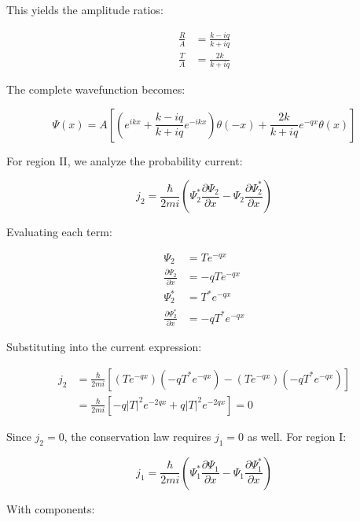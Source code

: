 \documentclass[italian]{HKNdocument}
\begin{document}
This yields the amplitude ratios:

\begin{align}
\frac{R}{A} & =\frac{k-i q}{k+i q} \\
\frac{T}{A} & =\frac{2 k}{k+i q} \label{eq:6.41}
\end{align}

The complete wavefunction becomes:

\begin{equation}
\Psi(x)=A\left[\left(e^{i k x}+\frac{k-i q}{k+i q} e^{-i k x}\right) \theta(-x)+\frac{2 k}{k+i q} e^{-q x} \theta(x)\right] \label{eq:6.42}
\end{equation}

For region II, we analyze the probability current:

\begin{equation}
j_{2}=\frac{\hbar}{2 m i}\left(\Psi_{2}^{*} \frac{\partial \Psi_{2}}{\partial x}-\Psi_{2} \frac{\partial \Psi_{2}^{*}}{\partial x}\right) \label{eq:6.43}
\end{equation}

Evaluating each term:

\begin{align}
\Psi_{2} & =T e^{-q x} \\
\frac{\partial \Psi_{2}}{\partial x} & =-q T e^{-q x} \\
\Psi_{2}^{*} & =T^{*} e^{-q x}  \label{eq:6.44}\\
\frac{\partial \Psi_{2}^{*}}{\partial x} & =-q T^{*} e^{-q x}
\end{align}

Substituting into the current expression:

\begin{align}
j_{2} & =\frac{\hbar}{2 m i}\left[\left(T e^{-q x}\right)\left(-q T^{*} e^{-q x}\right)-\left(T e^{-q x}\right)\left(-q T^{*} e^{-q x}\right)\right] \\
& =\frac{\hbar}{2 m i}\left[-q|T|^{2} e^{-2 q x}+q|T|^{2} e^{-2 q x}\right]=0 \label{eq:6.45}
\end{align}

Since $j_2 = 0$, the conservation law requires $j_1 = 0$ as well. For region I:

\begin{equation}
j_{1}=\frac{\hbar}{2 m i}\left(\Psi_{1}^{*} \frac{\partial \Psi_{1}}{\partial x}-\Psi_{1} \frac{\partial \Psi_{1}^{*}}{\partial x}\right) \label{eq:6.46}
\end{equation}

With components:
\end{document}

